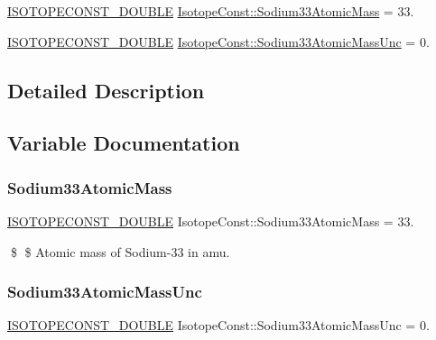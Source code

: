 \begin{DoxyCompactItemize}
\item 
\mbox{\hyperlink{group___isotope_const-_macros_ga8f45a7272ce02c0b4c65c44636ed719a}{I\+S\+O\+T\+O\+P\+E\+C\+O\+N\+S\+T\+\_\+\+D\+O\+U\+B\+LE}} \mbox{\hyperlink{group___isotope_const-_sodium-_na33_ga6f049aa4bd58f91a69cc639d61451772}{Isotope\+Const\+::\+Sodium33\+Atomic\+Mass}} = 33.
\item 
\mbox{\hyperlink{group___isotope_const-_macros_ga8f45a7272ce02c0b4c65c44636ed719a}{I\+S\+O\+T\+O\+P\+E\+C\+O\+N\+S\+T\+\_\+\+D\+O\+U\+B\+LE}} \mbox{\hyperlink{group___isotope_const-_sodium-_na33_ga58c1e7b15f4adc3aaf9de50f0ac24349}{Isotope\+Const\+::\+Sodium33\+Atomic\+Mass\+Unc}} = 0.
\end{DoxyCompactItemize}


\subsection{Detailed Description}


\subsection{Variable Documentation}
\mbox{\label{group___isotope_const-_sodium-_na33_ga6f049aa4bd58f91a69cc639d61451772}} 
\subsubsection{\texorpdfstring{Sodium33\+Atomic\+Mass}{Sodium33AtomicMass}}
{\footnotesize\ttfamily \mbox{\hyperlink{group___isotope_const-_macros_ga8f45a7272ce02c0b4c65c44636ed719a}{I\+S\+O\+T\+O\+P\+E\+C\+O\+N\+S\+T\+\_\+\+D\+O\+U\+B\+LE}} Isotope\+Const\+::\+Sodium33\+Atomic\+Mass = 33.}

\$ \$ Atomic mass of Sodium-\/33 in amu. \mbox{\label{group___isotope_const-_sodium-_na33_ga58c1e7b15f4adc3aaf9de50f0ac24349}} 
\subsubsection{\texorpdfstring{Sodium33\+Atomic\+Mass\+Unc}{Sodium33AtomicMassUnc}}
{\footnotesize\ttfamily \mbox{\hyperlink{group___isotope_const-_macros_ga8f45a7272ce02c0b4c65c44636ed719a}{I\+S\+O\+T\+O\+P\+E\+C\+O\+N\+S\+T\+\_\+\+D\+O\+U\+B\+LE}} Isotope\+Const\+::\+Sodium33\+Atomic\+Mass\+Unc = 0.}

